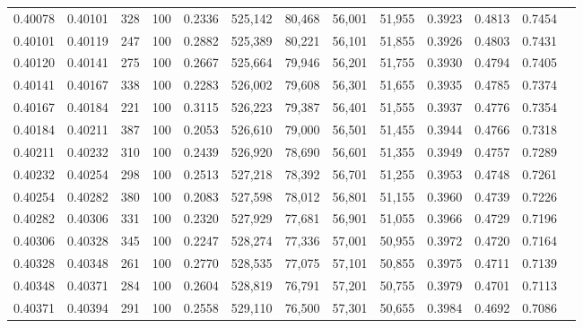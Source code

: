 \begin{tabular}{rrrrrrrrrrrrr}
0.40078 & 0.40101 &    328 & 100 &                                     0.2336 & 525,142 &  80,468 &  56,001 &  51,955 & 0.3923 & 0.4813 & 0.7454 \\
0.40101 & 0.40119 &    247 & 100 &                                     0.2882 & 525,389 &  80,221 &  56,101 &  51,855 & 0.3926 & 0.4803 & 0.7431 \\
0.40120 & 0.40141 &    275 & 100 &                                     0.2667 & 525,664 &  79,946 &  56,201 &  51,755 & 0.3930 & 0.4794 & 0.7405 \\
0.40141 & 0.40167 &    338 & 100 &                                     0.2283 & 526,002 &  79,608 &  56,301 &  51,655 & 0.3935 & 0.4785 & 0.7374 \\
0.40167 & 0.40184 &    221 & 100 &                                     0.3115 & 526,223 &  79,387 &  56,401 &  51,555 & 0.3937 & 0.4776 & 0.7354 \\
0.40184 & 0.40211 &    387 & 100 &                                     0.2053 & 526,610 &  79,000 &  56,501 &  51,455 & 0.3944 & 0.4766 & 0.7318 \\
0.40211 & 0.40232 &    310 & 100 &                                     0.2439 & 526,920 &  78,690 &  56,601 &  51,355 & 0.3949 & 0.4757 & 0.7289 \\
0.40232 & 0.40254 &    298 & 100 &                                     0.2513 & 527,218 &  78,392 &  56,701 &  51,255 & 0.3953 & 0.4748 & 0.7261 \\
0.40254 & 0.40282 &    380 & 100 &                                     0.2083 & 527,598 &  78,012 &  56,801 &  51,155 & 0.3960 & 0.4739 & 0.7226 \\
0.40282 & 0.40306 &    331 & 100 &                                     0.2320 & 527,929 &  77,681 &  56,901 &  51,055 & 0.3966 & 0.4729 & 0.7196 \\
0.40306 & 0.40328 &    345 & 100 &                                     0.2247 & 528,274 &  77,336 &  57,001 &  50,955 & 0.3972 & 0.4720 & 0.7164 \\
0.40328 & 0.40348 &    261 & 100 &                                     0.2770 & 528,535 &  77,075 &  57,101 &  50,855 & 0.3975 & 0.4711 & 0.7139 \\
0.40348 & 0.40371 &    284 & 100 &                                     0.2604 & 528,819 &  76,791 &  57,201 &  50,755 & 0.3979 & 0.4701 & 0.7113 \\
0.40371 & 0.40394 &    291 & 100 &                                     0.2558 & 529,110 &  76,500 &  57,301 &  50,655 & 0.3984 & 0.4692 & 0.7086 \\

\end{tabular}
